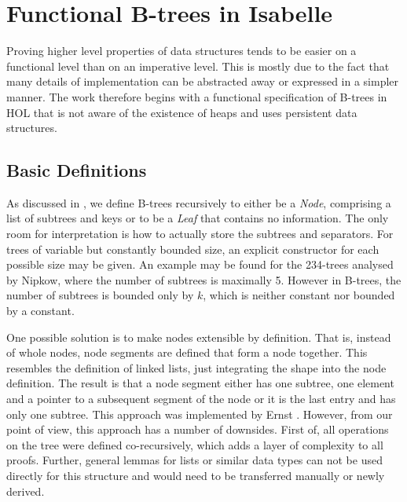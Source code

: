 

\chapter{Functional B-trees in Isabelle}\label{chapter:abs-set}

Proving higher level properties of data structures
tends to be easier on a functional level than on an imperative
level.
This is mostly due to the fact that many details of implementation
can be abstracted away or expressed in a simpler manner.
The work therefore begins with a functional specification of B-trees
in HOL that is not aware of the existence of heaps and uses
persistent data structures.

\section{Basic Definitions}
\label{sec:basic-defs}


As discussed in ,
we define B-trees recursively to either
be a \textit{Node}, comprising a list
of subtrees and keys or to be a \textit{Leaf}
that contains no information.
The only room for interpretation is how to actually
store the subtrees and separators.
For trees of variable but constantly bounded size,
an explicit constructor for each possible size may be given.
An example may be found for the 234-trees analysed by Nipkow\parencite{DBLP:conf/itp/Nipkow16},
where the number of subtrees is maximally 5.
However in B-trees, the number of subtrees
is bounded only by $k$, which is neither constant
nor bounded by a constant.

One possible solution is to make nodes
extensible by definition.
That is, instead of whole nodes,
node segments are defined that form a node together.
This resembles the definition of linked lists,
just integrating the shape into the node definition.
The result is that a node segment either has one subtree,
one element and a pointer to a subsequent segment of the node or
it is the last entry and has only one subtree.
This approach was implemented by Ernst \parencite{DBLP:journals/sosym/ErnstSR15}.
However, from our point of view, this approach has a number of downsides.
First of, all operations on the tree were defined co-recursively,
which adds a layer of complexity to all proofs.
Further, general lemmas for lists or similar data types can not
be used directly for this structure and would need to be transferred manually
or newly derived.

